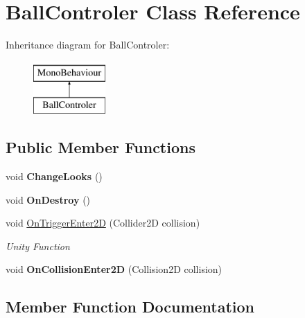\hypertarget{class_ball_controler}{}\section{Ball\+Controler Class Reference}
\label{class_ball_controler}
Inheritance diagram for Ball\+Controler\+:\begin{figure}[H]
\begin{center}
\leavevmode
\includegraphics[height=2.000000cm]{class_ball_controler}
\end{center}
\end{figure}
\subsection*{Public Member Functions}
\begin{DoxyCompactItemize}
\item 
void {\bfseries Change\+Looks} ()\hypertarget{class_ball_controler_a20f57ca6f864ef88c44a30b5a5fbae78}{}\label{class_ball_controler_a20f57ca6f864ef88c44a30b5a5fbae78}

\item 
void {\bfseries On\+Destroy} ()\hypertarget{class_ball_controler_adcd8fd481b8cdbf863fbf1e0414d45ef}{}\label{class_ball_controler_adcd8fd481b8cdbf863fbf1e0414d45ef}

\item 
void \hyperlink{class_ball_controler_a9fb2063e78fe75661acf869260983fe1}{On\+Trigger\+Enter2D} (Collider2D collision)
\begin{DoxyCompactList}\small\item\em Unity Function \end{DoxyCompactList}\item 
void {\bfseries On\+Collision\+Enter2D} (Collision2D collision)\hypertarget{class_ball_controler_a44a2da33549da48edc7cd96ac416aad4}{}\label{class_ball_controler_a44a2da33549da48edc7cd96ac416aad4}

\end{DoxyCompactItemize}


\subsection{Member Function Documentation}
